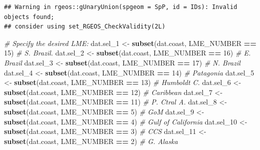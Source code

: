 \documentclass[12pt,]{article}
\newenvironment{Shaded}{\begin{snugshade}}{\end{snugshade}}
\newcommand{\CommentTok}[1]{\textcolor[rgb]{0.56,0.35,0.01}{\textit{#1}}}
\newcommand{\DecValTok}[1]{\textcolor[rgb]{0.00,0.00,0.81}{#1}}
\newcommand{\KeywordTok}[1]{\textcolor[rgb]{0.13,0.29,0.53}{\textbf{#1}}}
\newcommand{\NormalTok}[1]{#1}
\newcommand{\OperatorTok}[1]{\textcolor[rgb]{0.81,0.36,0.00}{\textbf{#1}}}
\newcommand{\StringTok}[1]{\textcolor[rgb]{0.31,0.60,0.02}{#1}}
\begin{document}
\begin{verbatim}
## Warning in rgeos::gUnaryUnion(spgeom = SpP, id = IDs): Invalid objects found;
## consider using set_RGEOS_CheckValidity(2L)
\end{verbatim}

\begin{Shaded}
\begin{Highlighting}[]
\CommentTok{# Specify the desired LME:}
\NormalTok{dat.sel_}\DecValTok{1}\NormalTok{ <-}\StringTok{ }\KeywordTok{subset}\NormalTok{(dat.coast, LME_NUMBER }\OperatorTok{==}\StringTok{ }\DecValTok{15}\NormalTok{) }\CommentTok{# S. Brazil. }
\NormalTok{dat.sel_}\DecValTok{2}\NormalTok{ <-}\StringTok{ }\KeywordTok{subset}\NormalTok{(dat.coast, LME_NUMBER }\OperatorTok{==}\StringTok{ }\DecValTok{16}\NormalTok{) }\CommentTok{# E. Brazil}
\NormalTok{dat.sel_}\DecValTok{3}\NormalTok{ <-}\StringTok{ }\KeywordTok{subset}\NormalTok{(dat.coast, LME_NUMBER }\OperatorTok{==}\StringTok{ }\DecValTok{17}\NormalTok{) }\CommentTok{# N. Brazil}
\NormalTok{dat.sel_}\DecValTok{4}\NormalTok{ <-}\StringTok{ }\KeywordTok{subset}\NormalTok{(dat.coast, LME_NUMBER }\OperatorTok{==}\StringTok{ }\DecValTok{14}\NormalTok{) }\CommentTok{# Patagonia}
\NormalTok{dat.sel_}\DecValTok{5}\NormalTok{ <-}\StringTok{ }\KeywordTok{subset}\NormalTok{(dat.coast, LME_NUMBER }\OperatorTok{==}\StringTok{ }\DecValTok{13}\NormalTok{) }\CommentTok{# Humboldt C.}
\NormalTok{dat.sel_}\DecValTok{6}\NormalTok{ <-}\StringTok{ }\KeywordTok{subset}\NormalTok{(dat.coast, LME_NUMBER }\OperatorTok{==}\StringTok{ }\DecValTok{12}\NormalTok{) }\CommentTok{# Caribbean}
\NormalTok{dat.sel_}\DecValTok{7}\NormalTok{ <-}\StringTok{ }\KeywordTok{subset}\NormalTok{(dat.coast, LME_NUMBER }\OperatorTok{==}\StringTok{ }\DecValTok{11}\NormalTok{) }\CommentTok{# P. Ctral A.}
\NormalTok{dat.sel_}\DecValTok{8}\NormalTok{ <-}\StringTok{ }\KeywordTok{subset}\NormalTok{(dat.coast, LME_NUMBER }\OperatorTok{==}\StringTok{ }\DecValTok{5}\NormalTok{) }\CommentTok{# GoM}
\NormalTok{dat.sel_}\DecValTok{9}\NormalTok{ <-}\StringTok{ }\KeywordTok{subset}\NormalTok{(dat.coast, LME_NUMBER }\OperatorTok{==}\StringTok{ }\DecValTok{4}\NormalTok{) }\CommentTok{# Gulf of California}
\NormalTok{dat.sel_}\DecValTok{10}\NormalTok{ <-}\StringTok{ }\KeywordTok{subset}\NormalTok{(dat.coast, LME_NUMBER }\OperatorTok{==}\StringTok{ }\DecValTok{3}\NormalTok{) }\CommentTok{# CCS}
\NormalTok{dat.sel_}\DecValTok{11}\NormalTok{ <-}\StringTok{ }\KeywordTok{subset}\NormalTok{(dat.coast, LME_NUMBER }\OperatorTok{==}\StringTok{ }\DecValTok{2}\NormalTok{) }\CommentTok{# G. Alaska}

\end{Highlighting}
\end{Shaded}
\end{document}
